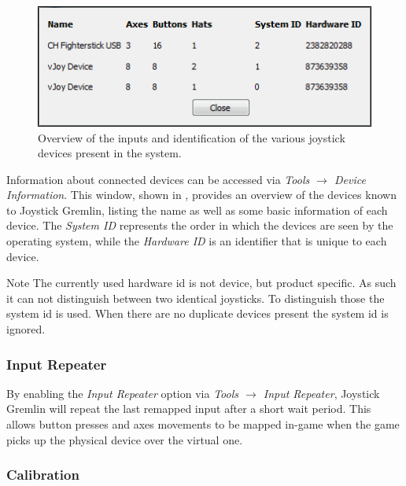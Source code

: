\documentclass[a4, 10pt]{article}
\newcommand{\JG}{Joystick Gremlin}
\begin{document}
\begin{figure}[bt]
    \centering

    \includegraphics[width=0.75\linewidth]{images/device_information}
    \caption{Overview of the inputs and identification of the various
        joystick devices present in the system.}
    \label{fig:device_information}
\end{figure}

Information about connected devices can be accessed via \emph{Tools
$\rightarrow$ Device Information}. This window, shown in
, provides an overview of the devices known
to \JG{}, listing the name as well as some basic information of each
device. The \emph{System ID} represents the order in which the devices
are seen by the operating system, while the \emph{Hardware ID} is an
identifier that is unique to each device.

\vspace{1em}
\begin{bclogo}[
    couleur=yellow!40,
    couleurBord=orange!80,
    couleurBarre=orange!80,
    arrondi=0.1,
    logo=\bcinfo
]{Note}
    The currently used hardware id is not device, but product specific.
    As such it can not distinguish between two identical joysticks. To
    distinguish those the system id is used. When there are no duplicate
    devices present the system id is ignored.
\end{bclogo}


\subsubsection{Input Repeater}

By enabling the \emph{Input Repeater} option via \emph{Tools
$\rightarrow$ Input Repeater}, \JG{} will repeat the last remapped input
after a short wait period. This allows button presses and axes movements
to be mapped in-game when the game picks up the physical device over the
virtual one.


\subsubsection{Calibration}
\end{document}
